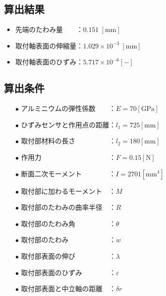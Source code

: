 \documentclass[twocolumn,a4j]{jsarticle}
\begin{document}
\subsection{算出結果}
\begin{screen}
    \begin{itemize}
        \item 先端のたわみ量　　：$0.151 \;\left[\mathrm{mm}\right]$
        \item 取付軸表面の伸縮量：$1.029 × 10^{-3} \;\left[\mathrm{mm}\right]$
        \item 取付軸表面のひずみ：$5.717 × 10^{-6} \left[\mathrm{-}\right]$
    \end{itemize}
\end{screen}

\subsection{算出条件}
\begin{screen}
    \begin{itemize}
        \item [$\bullet$] アルミニウムの弾性係数　　：$E = 70 \left[\mathrm{GPa}\right]$
        \item [$\bullet$] ひずみセンサと作用点の距離：$l_1 = 725 \left[\mathrm{mm}\right]$
        \item [$\bullet$] 取付部材料の長さ　　　　　：$l_2 = 180 \left[\mathrm{mm}\right]$
        \item [$\bullet$] 作用力　　　　　　　　　　：$F = 0.15 \left[\mathrm{N}\right]$
        \item [$\bullet$] 断面二次モーメント　　　　：$I = 2701 \left[\mathrm{mm^4}\right]$
        \item [$\bullet$] 取付部に加わるモーメント　：$M$
        \item [$\bullet$] 取付部のたわみの曲率半径　：$R$
        \item [$\bullet$] 取付部のたわみ角　　　　　：$\theta$
        \item [$\bullet$] 取付部のたわみ　　　　　　：$w$
        \item [$\bullet$] 取付部表面の伸び　　　　　：$\lambda$
        \item [$\bullet$] 取付部表面のひずみ　　　　：$\varepsilon$
        \item [$\bullet$] 取付部表面と中立軸の距離　：$\delta r$
    \end{itemize}
\end{screen}
\end{document}

